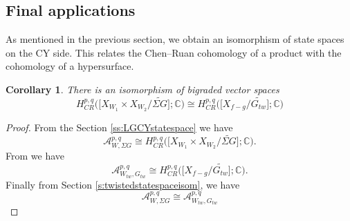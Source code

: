 \documentclass[10pt, letterpaper]{amsart}
\newtheorem{cor}[thm]{Corollary}
\theoremstyle{remark}
\newcommand{\CC}{\mathbb C}
\newcommand{\sA}{\mathscr{A}}
\newcommand{\tw}[1]{{#1}_{tw}}
\newcommand{\s}[1]{\Sigma #1}
\newcommand{\nathan}[1]{\todo[color=pistachio,fancyline]{N:#1}}
\begin{document}






\subsection{Final applications}\label{ss:applications}

As mentioned in the previous section, we obtain an isomorphism of state spaces on the CY side. This relates the Chen--Ruan cohomology of a product with the cohomology of a hypersurface. 
\begin{cor}There is an isomorphism of bigraded vector spaces
	\[
	H^{p,q}_{CR}\Big(\big[X_{W_1}\times X_{W_2}/\widetilde{\s{G}}\big];\CC\Big)\cong H^{p,q}_{CR}\Big(\big[X_{f-g}/\widetilde{\tw{G}}\big];\CC\Big)
	\]
\end{cor}

\begin{proof}
	From the Section \ref{ss:LGCYstatespace} we have
	\[
	\sA^{p,q}_{W,\s{G}}\cong H^{p,q}_{CR}\Big(\big[X_{W_1}\times X_{W_2}/\widetilde{\s{G}}\big];\CC\Big).
	\]
	From \cite{ChR} we have
	\[
	\sA^{p,q}_{\tw{W},\tw{G}}\cong H^{p,q}_{CR}\Big(\big[X_{f-g}/\widetilde{\tw{G}}\big];\CC\Big).
	\]
	Finally from Section \ref{s:twistedstatespaceisom}, we have
	\[
	\sA^{p,q}_{W,\s{G}}\cong\sA^{p,q}_{\tw{W},\tw{G}}
	\]
\end{proof}






%





\end{document}
